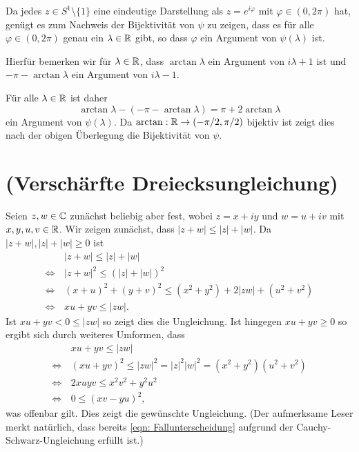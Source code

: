 \documentclass[a4paper,10pt]{article}
\begin{document}
Da jedes $z \in S^1 \setminus \{1\}$ eine eindeutige Darstellung als $z = e^{i\varphi}$ mit $\varphi \in (0,2\pi)$ hat, genügt es zum Nachweis der Bijektivität von $\psi$ zu zeigen, dass es für alle $\varphi \in (0,2\pi)$ genau ein $\lambda \in \mathbb{R}$ gibt, so dass $\varphi$ ein Argument von $\psi(\lambda)$ ist.

Hierfür bemerken wir für $\lambda \in \mathbb{R}$, dass $\arctan \lambda$ ein Argument von $i \lambda + 1$ ist und $-\pi - \arctan \lambda$ ein Argument von $i \lambda - 1$.

Für alle $\lambda \in \mathbb{R}$ ist daher
\[
 \arctan \lambda - (-\pi - \arctan \lambda)
 = \pi + 2\arctan \lambda
\]
ein Argument von $\psi(\lambda)$. Da $\arctan : \mathbb{R} \to (-\pi/2,\pi/2)$ bijektiv ist zeigt dies nach der obigen Überlegung die Bijektivität von $\psi$.





\section{(Verschärfte Dreiecksungleichung)}
Seien $z, w \in \mathbb{C}$ zunächst beliebig aber fest, wobei $z = x+iy$ und $w = u+iv$ mit $x,y,u,v \in \mathbb{R}$. Wir zeigen zunächst, dass $|z+w| \leq |z|+|w|$. Da $|z+w|, |z|+|w| \geq 0$ ist
\begin{align*}
                &\, |z+w| \leq |z|+|w| \\
 \Leftrightarrow&\, |z+w|^2 \leq (|z|+|w|)^2 \\
 \Leftrightarrow&\, (x+u)^2 + (y+v)^2 \leq (x^2+y^2) + 2|zw| + (u^2+v^2) \\
 \Leftrightarrow&\, xu+yv \leq |zw|. \tag{1} \label{eqn: Fallunterscheidung}
\end{align*}
Ist $xu+yv < 0 \leq |zw|$ so zeigt dies die Ungleichung. Ist hingegen $xu+yv \geq 0$ so ergibt sich durch weiteres Umformen, dass
\begin{align*}
                &\, xu + yv \leq |zw| \\
 \Leftrightarrow&\, (xu+yv)^2 \leq |zw|^2 = |z|^2 |w|^2 = (x^2+y^2)(u^2+v^2) \\
 \Leftrightarrow&\, 2xuyv \leq x^2v^2 + y^2u^2 \\
 \Leftrightarrow&\, 0 \leq (xv-yu)^2, \tag{2} \label{eqn: Determinante}
\end{align*}
was offenbar gilt. Dies zeigt die gewünschte Ungleichung. (Der aufmerksame Leser merkt natürlich, dass bereits \eqref{eqn: Fallunterscheidung} aufgrund der Cauchy-Schwarz-Ungleichung erfüllt ist.)
\end{document}
